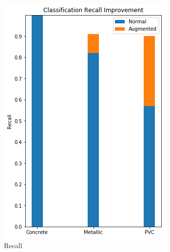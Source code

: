 \begin{figure}[H]
\begin{subfigure}[b]{0.4\linewidth}
    \includegraphics[width=\linewidth]{figures/Time-Recall.png}
    \caption{Recall}
  \end{subfigure}
  \begin{subfigure}[b]{0.4\linewidth}

\end{subfigure}
\end{figure}
